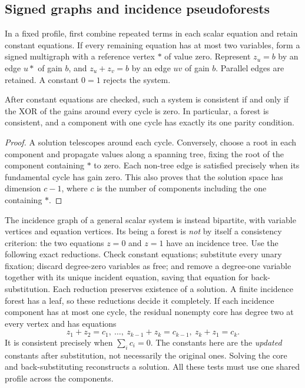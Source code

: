 \subsection{Signed graphs and incidence pseudoforests}
\label{app:forest-cases}
In a fixed profile, first combine repeated terms in each scalar equation and
retain constant equations. If every remaining equation has at most two variables,
form a signed multigraph with a reference vertex $*$ of value zero. Represent
$z_u=b$ by an edge $u*$ of gain $b$, and $z_u+z_v=b$ by an edge $uv$ of gain $b$.
Parallel edges are retained. A constant $0=1$ rejects the system.

\begin{proposition}\label{prop:affine-graph-balance}
After constant equations are checked, such a system is consistent if and only
if the XOR of the gains around every cycle is zero. In particular, a forest is
consistent, and a component with one cycle has exactly its one parity condition.
\end{proposition}
\begin{proof}
A solution telescopes around each cycle. Conversely, choose a root in each
component and propagate values along a spanning tree, fixing the root of the
component containing $*$ to zero. Each non-tree edge is satisfied precisely when
its fundamental cycle has gain zero. This also proves that the solution space
has dimension $c-1$, where $c$ is the number of components including the one
containing $*$.
\end{proof}

The incidence graph of a general scalar system is instead bipartite, with variable
vertices and equation vertices. Its being a forest is \emph{not} by itself a
consistency criterion: the two equations $z=0$ and $z=1$ have an incidence tree.
Use the following exact reductions. Check constant equations; substitute every
unary fixation; discard degree-zero variables as free; and remove a degree-one
variable together with its unique incident equation, saving that equation for
back-substitution. Each reduction preserves existence of a solution. A finite
incidence forest has a leaf, so these reductions decide it completely.
If each incidence component has at most one cycle, the residual nonempty core
has degree two at every vertex and has equations
\[
 z_1+z_2=c_1,\ \ldots,\ z_{k-1}+z_k=c_{k-1},\ z_k+z_1=c_k.
\]
It is consistent precisely when $\sum_i c_i=0$. The constants here are the
\emph{updated} constants after substitution, not necessarily the original ones.
Solving the core and back-substituting reconstructs a solution. All these tests
must use one shared profile across the components.


